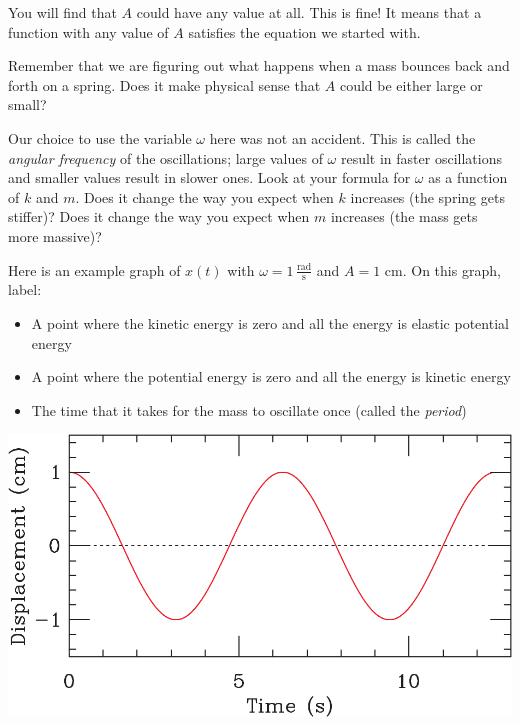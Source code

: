 \documentclass[12pt]{article}
\begin{document}
\vspace{1in}

You will find that $A$ could have any value at all. This is fine! It means that a function with any value of $A$ satisfies the equation we started with.

Remember that we are figuring out what happens when a mass bounces back and forth on a spring. Does it make physical sense that $A$ could be either large or small?

\vspace{1in}

Our choice to use the variable $\omega$ here was not an accident. This is called the {\it angular frequency} of the oscillations; large values of $\omega$ result in faster oscillations and smaller values result in slower ones. Look at your formula for $\omega$ as a function of $k$ and $m$. Does it change the way you expect when $k$ increases (the spring gets stiffer)? Does it change the way you expect when $m$ increases (the mass gets more massive)?

\vspace{0.8in}

\begin{minipage}{0.6\textwidth}
Here is an example graph of $x(t)$ with $\omega=1\, \frac{\text{rad}}{\text {s}}$ and $A = 1$ cm. On this graph, label:

\begin{itemize}
\item A point where the kinetic energy is zero and all the energy is elastic potential energy
\item A point where the potential energy is zero and all the energy is kinetic energy
\item The time that it takes for the mass to oscillate once (called the {\it period})
\end{itemize}
\end{minipage}
\begin{minipage}{0.4\textwidth}
\includegraphics [width=\textwidth]{plot11.pdf}
\end{minipage}
\end{document}
